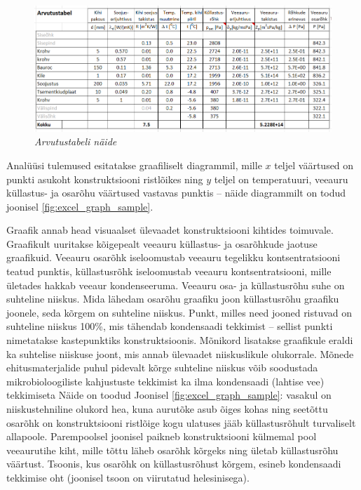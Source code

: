 \begin{figure}[ht]
    \centering
    \includegraphics[width=1\textwidth]{figures/problem_statement/04_calc_table.png}
    \caption[Näide niiskustehnilise analüüsi tulemuste esitamisest tabelis]{\textit{Arvutustabeli näide}}
    \label{fig:excel_table_sample}
\end{figure}

Analüüsi tulemused esitatakse graafiliselt diagrammil, mille \begin{math}x\end{math} teljel väärtused on 
punkti asukoht konstruktsiooni ristlõikes ning \begin{math}y\end{math} teljel on temperatuuri, veeauru küllastus- ja
osarõhu väärtused vastavas punktis -- näide diagrammilt on todud joonisel  \ref{fig:excel_graph_sample}.

Graafik annab head visuaalset ülevaadet konstruktsiooni kihtides toimuvale. Graafikult uuritakse kõigepealt 
veeauru küllastus- ja osarõhkude jaotuse graafikuid. Veeauru osarõhk iseloomustab veeauru tegelikku kontsentratsiooni
teatud punktis, küllastusrõhk iseloomustab veeauru kontsentratsiooni, mille ületades hakkab veeaur kondenseeruma.
Veeauru osa- ja küllastusrõhu suhe on suhteline niiskus. Mida lähedam osarõhu graafiku joon küllastusrõhu graafiku 
joonele, seda kõrgem on suhteline niiskus. Punkt, milles need jooned ristuvad on suhteline niiskus 100\%, mis 
tähendab kondensaadi tekkimist -- sellist punkti nimetatakse kastepunktiks konstruktsioonis. Mõnikord lisatakse graafikule
eraldi ka suhtelise niiskuse joont, mis annab ülevaadet niiskuslikule olukorrale. Mõnede ehitusmaterjalide puhul pidevalt
kõrge suhteline niiskus võib soodustada mikrobioloogiliste kahjustuste tekkimist ka ilma kondensaadi (lahtise vee) tekkimiseta\cite{majavammist}
Näide on toodud Joonisel \ref{fig:excel_graph_sample}: vasakul on niiskustehniline olukord hea, kuna aurutõke asub õiges 
kohas ning seetõttu osarõhk on konstruktsiooni ristlõige kogu ulatuses jääb küllastusrõhult turvaliselt allapoole.
Parempoolsel joonisel paikneb konstruktsiooni külmemal pool veeaurutihe kiht, mille tõttu läheb osarõhk kõrgeks ning 
ületab küllastusrõhu väärtust. Tsoonis, kus osarõhk on küllastusrõhust kõrgem, esineb kondensaadi tekkimise oht (joonisel
tsoon on viirutatud helesinisega).

